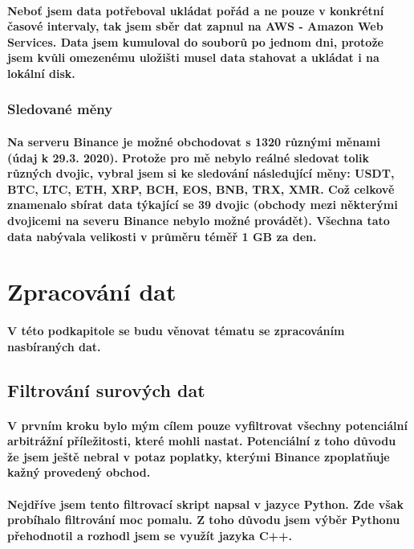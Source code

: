 \documentclass[thesis=B,czech]{FITthesis}[2019/03/21]
\begin{document}
\paragraph{
Neboť jsem data potřeboval ukládat pořád a ne pouze v konkrétní časové intervaly, tak jsem sběr dat zapnul na AWS - Amazon Web Services. Data jsem kumuloval do souborů po jednom dni, protože jsem kvůli omezenému uložišti musel data stahovat a ukládat i na lokální disk.
}
\subsubsection{Sledované měny}
\paragraph{
Na serveru Binance je možné obchodovat s 1320 různými měnami (údaj k 29.3. 2020). Protože pro mě nebylo reálné sledovat tolik různých dvojic, vybral jsem si ke sledování následující měny: USDT, BTC, LTC, ETH, XRP, BCH, EOS, BNB, TRX, XMR. Což celkově znamenalo sbírat data týkající se 39 dvojic (obchody mezi některými dvojicemi na severu Binance nebylo možné provádět). Všechna tato data nabývala velikosti v průměru téměř 1 GB za den.
}
\section{Zpracování dat}
\paragraph{
V této podkapitole se budu věnovat tématu se zpracováním nasbíraných dat.
}
\subsection{Filtrování surových dat}
\paragraph{
V prvním kroku bylo mým cílem pouze vyfiltrovat všechny potenciální arbitrážní příležitosti, které mohli nastat. Potenciální z toho důvodu že jsem ještě nebral v potaz poplatky, kterými Binance zpoplatňuje kažný provedený obchod.
}
\paragraph{
Nejdříve jsem tento filtrovací skript napsal v jazyce Python. Zde však probíhalo filtrování moc pomalu. Z toho důvodu jsem výběr Pythonu přehodnotil a rozhodl jsem se využít jazyka C++. 
}
\end{document}
